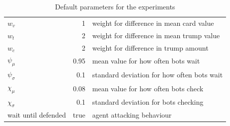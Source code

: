 \documentclass[a4paper,titlepage]{article}
\begin{document}
\begin{table}[h]
\begin{tabular}{lrl}
    $w_v$ & 1 & weight for difference in mean card value \\
    $w_t$ & 2 & weight for difference in mean trump value \\
    $w_c$ & 2 & weight for difference in trump amount \\
    $\psi_\mu$ & 0.95 & mean value for how often bots wait \\
    $\psi_\sigma$ & 0.1 & standard deviation for how often bots wait \\
    $\chi_\mu$ & 0.08 & mean value for how often bots check \\
    $\chi_\sigma$ & 0.1 & standard deviation for bots checking \\
    wait until defended & true & agent attacking behaviour \\
    \bottomrule
  \end{tabular}
  \caption{Default parameters for the experiments}
  \label{table:parameters}
\end{table}

\newpage
\end{document}
